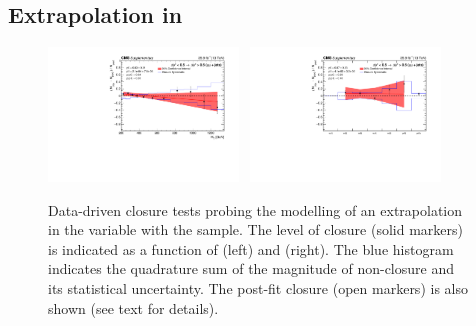
\clearpage
\subsection{Extrapolation in \texorpdfstring{\bdphi}{biased dPhi}}

\begin{figure}[h!]
  \begin{center}
    \includegraphics[width=0.45\textwidth]{figures/closureTests/bDPhi/DoubleMu_bdphiExtrapolation_ht.pdf}~
    \includegraphics[width=0.45\textwidth]{figures/closureTests/bDPhi/DoubleMu_bdphiExtrapolation_nJet.pdf}\\
    \caption{Data-driven closure tests probing the modelling of an
      extrapolation in the \bdphi variable with the \mmj sample. The
      level of closure (solid markers) is indicated as a function of
      \scalht (left) and \njet (right). The blue histogram indicates
      the quadrature sum of the magnitude of non-closure and its
      statistical uncertainty. The post-fit closure (open markers) is
      also shown (see text for details).  }
    \label{fig:closure_bDPhi_mumu}
  \end{center} 
\end{figure}

